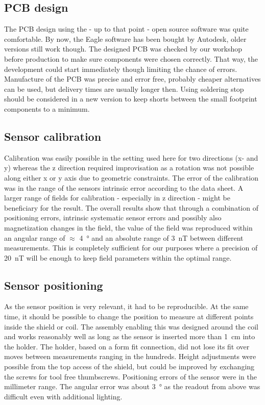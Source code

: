         \subsection{PCB design}
            The PCB design using the - up to that point - open source software was quite comfortable. By now, the Eagle software has been bought by Autodesk, older versions still work though. The designed PCB was checked by our workshop before production to make sure components were chosen correctly. That way, the development could start immediately though limiting the chance of errors. Manufacture of the PCB was precise and error free, probably cheaper alternatives can be used, but delivery times are usually longer then. Using soldering stop should be considered in a new version to keep shorts between the small footprint components to a minimum.
        \subsection{Sensor calibration}
            Calibration was easily possible in the setting used here for two directions (x- and y) whereas the z direction required improvisation as a rotation was not possible along either x or y axis due to geometric constraints. The error of the calibration was in the range of the sensors intrinsic error according to the data sheet. A larger range of fields for calibration - especially in z direction - might be beneficiary for the result.
            The overall results show that through a combination of positioning errors, intrinsic systematic sensor errors and possibly also magnetization changes in the field, the value of the field was reproduced within an angular range of $\approx$ \SI{4}{\degree} and an absolute range of \SI{3}{\nano\tesla} between different measurements. This is completely sufficient for our purposes where a precision of \SI{20}{\nano\tesla} will be enough to keep field parameters within the optimal range.
        \subsection{Sensor positioning}
            As the sensor position is very relevant, it had to be reproducible. At the same time, it should be possible to change the position to measure at different points inside the shield or coil. The assembly enabling this was designed around the coil and works reasonably well as long as the sensor is inserted more than \SI{1}{\centi\meter} into the holder. The holder, based on a form fit connection, did not lose its fit over moves between measurements ranging in the hundreds. Height adjustments were possible from the top access of the shield, but could be improved by exchanging the screws for tool free thumbscrews. Positioning errors of the sensor were in the millimeter range. The angular error was about \SI{3}{\degree} as the readout from above was difficult even with additional lighting.
